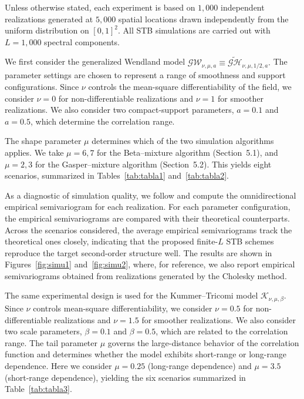 \documentclass[
  12pt]{article}
\begin{document}
Unless otherwise stated, each experiment is based on $1{,}000$ independent realizations generated at $5{,}000$ spatial locations drawn independently from the uniform distribution on $[0,1]^2$.
All STB simulations are carried out with $L=1{,}000$ spectral components.

We first consider the generalized Wendland model
$
\mathcal{GW}_{\nu,\mu,a}\equiv \widetilde{\mathcal{GH}}_{\nu,\mu,1/2,a}.
$
The parameter settings are chosen to represent a range of smoothness and support configurations.
Since $\nu$ controls the mean-square differentiability of the field, we consider $\nu=0$ for non-differentiable realizations and $\nu=1$ for smoother realizations.
We also consider two compact-support parameters, $a=0.1$ and $a=0.5$, which determine the correlation range.

The shape parameter $\mu$ determines which of the two simulation algorithms applies.
We take $\mu=6,7$ for the Beta--mixture algorithm (Section~5.1), and $\mu=2,3$ for the Gasper--mixture algorithm (Section~5.2).
This yields eight scenarios, summarized in Tables~\ref{tab:tabla1} and~\ref{tab:tabla2}.

As a diagnostic of simulation quality, we follow \citet{emery2016,cuevas2019fast,arroyo2021} and compute the omnidirectional empirical semivariogram for each realization.
For each parameter configuration, the empirical semivariograms are compared with their theoretical counterparts.
Across the scenarios considered, the average empirical semivariograms track the theoretical ones closely, indicating that the proposed finite-$L$ STB schemes reproduce the target second-order structure well.
The results are shown in Figures~\ref{fig:simu1} and~\ref{fig:simu2}, where, for reference, we also report empirical semivariograms obtained from realizations generated by the Cholesky method.

The same experimental design is used for the Kummer--Tricomi model $\mathcal{K}_{\nu,\mu,\beta}$.
Since $\nu$ controls mean-square differentiability, we consider $\nu=0.5$ for non-differentiable realizations and $\nu=1.5$ for smoother realizations.
We also consider two scale parameters, $\beta=0.1$ and $\beta=0.5$, which are related to the correlation range.
The tail parameter $\mu$ governs the large-distance behavior of the correlation function and determines whether the model exhibits short-range or long-range dependence.
Here we consider $\mu=0.25$ (long-range dependence) and $\mu=3.5$ (short-range dependence), yielding the six scenarios summarized in Table~\ref{tab:tabla3}.
\end{document}
